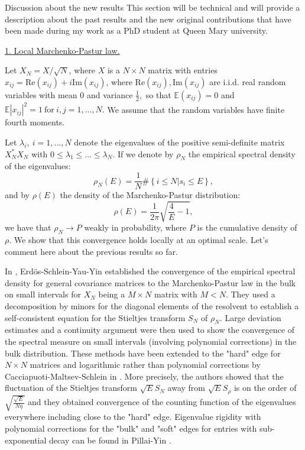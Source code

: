 \documentclass[11pt, a4paper, oneside]{book}
\numberwithin{equation}{chapter}
\begin{document}
\begin{section}{Discussion about the new results}
%
This section will be technical and will provide a description about the past results and the new original contributions that have been made during my work as a PhD student at Queen Mary university.

\underline{1. Local Marchenko-Pastur law.}

Let $X_N = X/\sqrt{N} $, where $X$ is a $N \times N$ matrix with entries $x_{ij} = \mathrm{Re}(x_{ij}) + i \mathrm{Im}(x_{ij})$, where $\mathrm{Re}(x_{ij}), \mathrm{Im}(x_{ij}) $ are i.i.d. real random variables with mean $0$ and variance $\frac{1}{2},$ so that $\mathbb{E} (x_{ij}) = 0$ and $\mathbb{E}|x_{ij}|^2=1 \ \text{for} \ i,j =1,...,N.$ We assume that the random variables have finite fourth moments.

Let $\lambda_i, \ i=1,...,N$ denote the eigenvalues of the positive semi-definite matrix $X_N^*X_N$ with $0\leq \lambda_1 \leq ... \leq \lambda_N .$ If we denote by $\rho_N$ the empirical spectral density of the eigenvalues:
%
$$ \rho_N(E) = \frac{1}{N} \# \left \{ i \leq N | s_i \leq E \right \}, $$
and by $\rho(E)$ the density of the Marchenko-Pastur distribution:
%
$$ \rho(E) = \frac{1}{2\pi} \sqrt{ \frac{4}{E} - 1}, $$
we have that $\rho_N \to P $ weakly in probability, where $P$ is the cumulative density of $\rho$. We show that this convergence holds locally at an optimal scale. Let's comment here about the previous results so far.

In \cite{erdos2012local}, Erd\"os-Schlein-Yau-Yin established the convergence of the empirical spectral density for general covariance matrices to the Marchenko-Pastur law in the bulk on small intervals for $X_N$ being a $M \times N$ matrix with $M<N$. They used a decomposition by minors for the diagonal elements of the resolvent to establish a self-consistent equation for the Stieltjes transform $S_N$ of $\rho_N$. Large deviation estimates and a continuity argument were then used to show the convergence of the spectral measure on small intervals (involving polynomial corrections) in the bulk  distribution. These methods have been extended to the "hard" edge for $N \times N$ matrices and logarithmic rather than polynomial corrections by Cacciapuoti-Maltsev-Schlein in \cite{cacciapuoti2013local}. More precisely, the authors showed that the fluctuation of the Stieltjes transform $\sqrt E S_N$ away from $\sqrt E S_{\rho}$ is on the order of $\sqrt{\frac{\sqrt{E}}{N\eta}}$ and they obtained convergence of the counting function of the eigenvalues everywhere including close to the "hard" edge. Eigenvalue rigidity with polynomial corrections for the "bulk" and "soft" edges for entries with sub-exponential decay can be found in Pillai-Yin \cite{pillai2014universality}.


\end{section}
\end{document}
